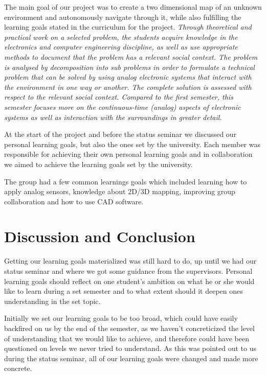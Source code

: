 The main goal of our project was to create a two dimensional map of an unknown environment and autonomously navigate through it, while also fulfilling the learning goals stated in the curriculum for the project.
\textit{Through theoretical and practical work on a selected problem, the
students acquire knowledge in the electronics and computer engineering
discipline, as well as use appropriate methods to document that the
problem has a relevant social context. The problem is analysed by
decomposition into sub problems in order to formulate a technical
problem that can be solved by using analog electronic systems that
interact with the environment in one way or another. The complete
solution is assessed with respect to the relevant social context. Compared
to the first semester, this semester focuses more on the continuous-time
(analog) aspects of electronic systems as well as interaction with the
surroundings in greater detail.}

At the start of the project and before the status seminar we discussed our personal learning goals, but also the ones set by the university. Each member was responsible for achieving their own personal learning goals and in collaboration we aimed to achieve the learning goals set by the university.

The group had a few common learnings goals which included learning how to apply analog sensors, knowledge about 2D/3D mapping, improving group collaboration and how to use CAD software.

\section{Discussion and Conclusion}

Getting our learning goals materialized was still hard to do, up until we had our status seminar and where we got some guidance from the supervisors. Personal learning goals should reflect on one student's ambition on what he or she would like to learn during a set semester and to what extent should it deepen ones understanding in the set topic. 

Initially we set our learning goals to be too broad, which could have easily backfired on us by the end of the semester, as we haven't concreticized the level of understanding that we would like to achieve, and therefore could have been questioned on levels we never tried to understand. As this was pointed out to us during the status seminar, all of our learning goals were changed and made more concrete. 

